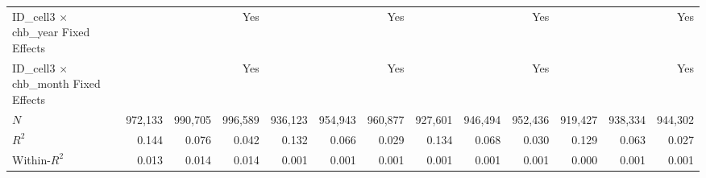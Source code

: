 \begin{tabular}{lrrrrrrrrrrrr}
ID\_cell3 $\times$ chb\_year Fixed Effects  &              &              &          Yes &              &              &          Yes &              &              &          Yes &              &              &          Yes \\ 
ID\_cell3 $\times$ chb\_month Fixed Effects &              &              &          Yes &              &              &          Yes &              &              &          Yes &              &              &          Yes \\ 
\midrule
$N$                                         &      972,133 &      990,705 &      996,589 &      936,123 &      954,943 &      960,877 &      927,601 &      946,494 &      952,436 &      919,427 &      938,334 &      944,302 \\ 
$R^2$                                       &        0.144 &        0.076 &        0.042 &        0.132 &        0.066 &        0.029 &        0.134 &        0.068 &        0.030 &        0.129 &        0.063 &        0.027 \\ 
Within-$R^2$                                &        0.013 &        0.014 &        0.014 &        0.001 &        0.001 &        0.001 &        0.001 &        0.001 &        0.001 &        0.000 &        0.001 &        0.001 \\ 
\bottomrule
\end{tabular}
